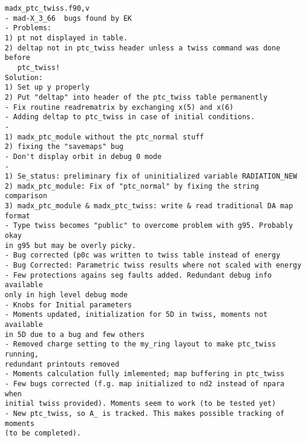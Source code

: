\begin{verbatim}
madx_ptc_twiss.f90,v
- mad-X_3_66  bugs found by EK
- Problems:
1) pt not displayed in table.
2) deltap not in ptc_twiss header unless a twiss command was done before
   ptc_twiss!
Solution:
1) Set up y properly
2) Put "deltap" into header of the ptc_twiss table permanently
- Fix routine readrematrix by exchanging x(5) and x(6)
- Adding deltap to ptc_twiss in case of initial conditions.
-
1) madx_ptc_module without the ptc_normal stuff
2) fixing the "savemaps" bug
- Don't display orbit in debug 0 mode
-
1) Se_status: preliminary fix of uninitialized variable RADIATION_NEW
2) madx_ptc_module: Fix of "ptc_normal" by fixing the string comparison
3) madx_ptc_module & madx_ptc_twiss: write & read traditional DA map format
- Type twiss becomes "public" to overcome problem with g95. Probably okay
in g95 but may be overly picky.
- Bug corrected (p0c was written to twiss table instead of energy
- Bug Corrected: Parametric twiss results where not scaled with energy
- Few protections agains seg faults added. Redundant debug info available 
only in high level debug mode
- Knobs for Initial parameters
- Moments updated, initialization for 5D in twiss, moments not available
in 5D due to a bug and few others
- Removed charge setting to the my_ring layout to make ptc_twiss running, 
redundant printouts removed
- Moments calculation fully imlemented; map buffering in ptc_twiss
- Few bugs corrected (f.g. map initialized to nd2 instead of npara when 
initial twiss provided). Moments seem to work (to be tested yet)
- New ptc_twiss, so A_ is tracked. This makes possible tracking of moments 
(to be completed).


\end{verbatim}
